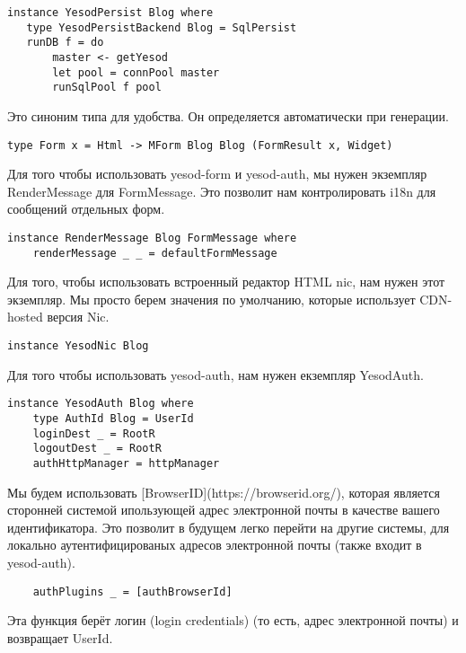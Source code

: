 \begin{lstlisting}
instance YesodPersist Blog where
   type YesodPersistBackend Blog = SqlPersist
   runDB f = do 
       master <- getYesod
       let pool = connPool master
       runSqlPool f pool
\end{lstlisting}
 
Это синоним типа для удобства. Он определяется автоматически при генерации. 
 
\begin{lstlisting}
type Form x = Html -> MForm Blog Blog (FormResult x, Widget)
\end{lstlisting}
 
Для того чтобы использовать yesod-form и yesod-auth, мы нужен экземпляр RenderMessage для FormMessage. Это позволит нам контролировать i18n для сообщений отдельных форм. 
 
\begin{lstlisting}
instance RenderMessage Blog FormMessage where
    renderMessage _ _ = defaultFormMessage
\end{lstlisting}
 
Для того, чтобы использовать встроенный редактор HTML nic, нам нужен этот экземпляр. Мы просто берем значения по умолчанию, которые использует CDN-hosted версия Nic. 
 
\begin{lstlisting}
instance YesodNic Blog
\end{lstlisting}
 
Для того чтобы использовать yesod-auth, нам нужен екземпляр YesodAuth. 
 
\begin{lstlisting}
instance YesodAuth Blog where
    type AuthId Blog = UserId
    loginDest _ = RootR
    logoutDest _ = RootR
    authHttpManager = httpManager
\end{lstlisting}
 
Мы будем использовать [BrowserID](https://browserid.org/), которая является сторонней системой ипользующей адрес электронной почты в качестве вашего идентификатора. Это позволит в будущем легко перейти на другие системы, для локально аутентифицированых адресов электронной почты (также входит в yesod-auth). 
 
\begin{lstlisting}
    authPlugins _ = [authBrowserId]
\end{lstlisting}
 
Эта функция берёт логин (login credentials) (то есть, адрес электронной почты) и возвращает UserId. 
 
